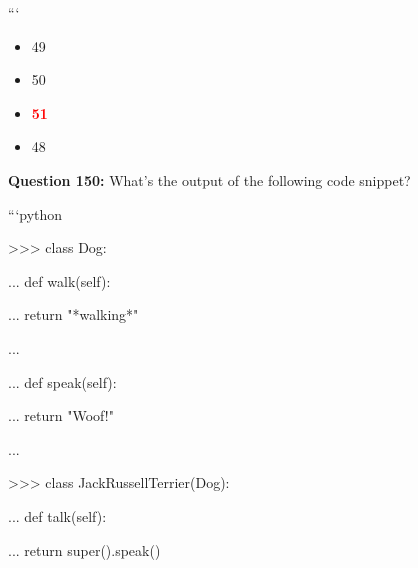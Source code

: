 \documentclass[12pt,a4paper]{article}
\begin{document}
\newline
```

\begin{itemize}
    \item[\textbf{A.}] 49
    \item[\textbf{B.}] 50
    \item[\textbf{C.}] \textcolor{red}{\textbf{51}}
    \item[\textbf{D.}] 48
\end{itemize}

\vspace{0.5cm}

\textbf{Question 150:} What's the output of the following code snippet?\newline

\newline
\newline

\newline
```python\newline

\newline
>>> class Dog:\newline

\newline
...     def walk(self):\newline

\newline
...         return "*walking*"\newline

\newline
...\newline

\newline
...     def speak(self):\newline

\newline
...         return "Woof!"\newline

\newline
...\newline

\newline
>>> class JackRussellTerrier(Dog):\newline

\newline
...     def talk(self):\newline

\newline
...         return super().speak()\newline
\end{document}
